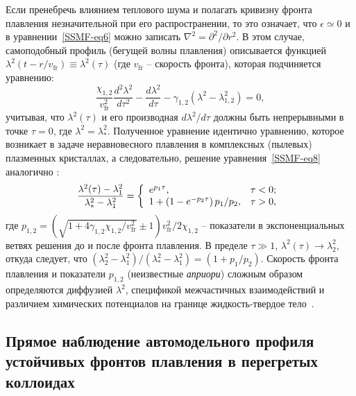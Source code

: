 Если пренебречь влиянием теплового шума и полагать кривизну фронта плавления незначительной при его распространении, то это означает, что $ \epsilon \simeq 0 $ и в уравнении~\eqref{SSMF-eq6} можно записать $ \nabla ^ 2 = \partial ^ 2 / \partial r ^ 2 $.
В этом случае, самоподобный профиль (бегущей волны плавления) описывается функцией $\lambda^2(t-r/v_\mathrm{fr})\equiv \lambda^2(\tau)$ (где $v_\mathrm{fr}$ -- скорость фронта), которая подчиняется уравнению:
\begin{equation}
\label{SSMF-eq8}
\frac{\chi_{1,2}}{v_{\mathrm{fr}}^2} \frac{d^2 \lambda^2}{d\tau^2} -\frac{d \lambda^2}{d \tau} -\gamma_{1,2}(\lambda^2-\lambda_{1,2}^2) =0,
\end{equation}
учитывая, что $\lambda^2(\tau) $ и его производная $ d\lambda^2/ d \tau $ должны быть непрерывными в точке $ \tau = 0 $, где $\lambda^2=\lambda_\ast^2$.
Полученное уравнение идентично уравнению, которое возникает в задаче неравновесного плавления в комплексных (пылевых) плазменных кристаллах, а следовательно, решение уравнения~\eqref{SSMF-eq8} аналогично \cite{10.1103/physreve.96.043201, 10.1103/physreve.100.023203}:
\begin{equation}
\label{SSMF-eq9}
\frac{\lambda^2(\tau)-\lambda^2_1}{\lambda^2_\ast-\lambda^2_1}=
\left\{
  \begin{array}{ll}
    e^{p_1 \tau}, & \tau < 0;\\
   1+\left(1-e^{-p_2\tau}\right)p_1/p_2 , & \tau > 0,\\
  \end{array}
\right. \\
\end{equation}
где $ p_{1,2} = \left(\sqrt {1 + 4 \gamma_{1,2} \chi_{1,2} / v_\mathrm{fr} ^ 2} \pm 1 \right) v_\mathrm{fr} ^ 2/2 \chi_{1,2} $ -- показатели в экспоненциальных ветвях решения до и после фронта плавления.
В пределе $\tau \gg 1$, $\lambda^2(\tau) \rightarrow \lambda_2^2$, откуда следует, что
$\left(\lambda_2^2-\lambda^2_1\right)/\left(\lambda^2_\ast-\lambda^2_1\right) = (1+p_1/p_2)$.
Скорость фронта плавления и показатели $p_{1,2} $ (неизвестные \emph{априори}) сложным образом определяются диффузией $\lambda^2$, спецификой межчастичных взаимодействий и различием химических потенциалов на границе жидкость-твердое тело~\cite{10.1038/ncomms7942}.

\subsection{Прямое наблюдение автомодельного профиля устойчивых фронтов плавления в перегретых коллоидах}
\label{SSMF-Results-Experiment}

